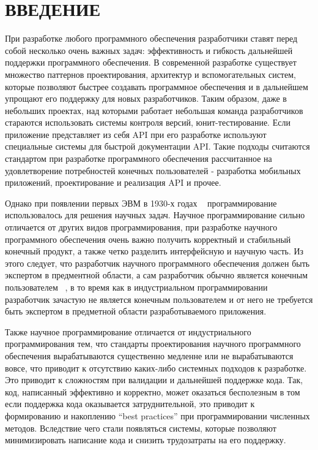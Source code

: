 \chapter*{ВВЕДЕНИЕ}\label{chap.introduction}


При разработке любого программного обеспечения разработчики ставят перед собой несколько очень важных задач: эффективность и гибкость дальнейшей поддержки программного обеспечения. В современной разработке существует множество паттернов проектирования, архитектур и вспомогательных систем, которые позволяют быстрее создавать программное обеспечения и в дальнейшем упрощают его поддержку для новых разработчиков. Таким образом, даже в небольших проектах, над которыми работает небольшая команда разработчиков стараются использовать системы контроля версий, юнит-тестирование. Если приложение представляет из себя API при его разработке используют специальные системы для быстрой документации API. Такие подходы считаются стандартом при разработке программного обеспечения рассчитанное на удовлетворение потребностей конечных пользователей - разработка мобильных приложений, проектирование и реализация API и прочее.

Однако при появлении первых ЭВМ в 1930-х годах ~\cite{FirstComputers} программирование использовалось для решения научных задач. Научное программирование сильно отличается от других видов программирования, при разработке научного программного обеспечения очень важно получить корректный и стабильный конечный продукт, а также четко разделить интерфейсную и научную часть. Из этого следует, что разработчик научного программного обеспечения должен быть экспертом в предментной области, а сам разработчик обычно является конечным пользователем ~\cite{ScientificDevelopment}, в то время как в индустриальном программировании разработчик зачастую не является конечным пользователем и от него не требуется быть экспертом в предметной области разработываемого приложения.

Также научное программирование отличается от индустриального программирования тем, что стандарты проектирования научного программного обеспечения вырабатываются существенно медленне или не вырабатываются вовсе, что приводит к отсутствию каких-либо системных подходов к разработке. Это приводит к сложностям при валидации и дальнейшей поддержке кода. Так, код, написанный эффективно и корректно, может оказаться бесполезным в том  если поддержка кода оказывается затруднительной, это приводит к формированию и накоплению ``best practices'' при программировании численных методов. Вследствие чего стали появляться системы, которые позволяют минимизировать написание кода и снизить трудозатраты на его поддержку.

